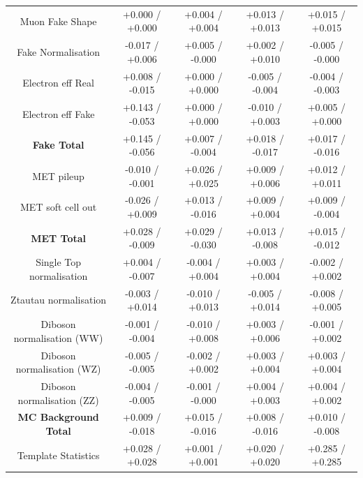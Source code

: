 \begin{table}[htbp]
\begin{center}
\begin{tabular}{|c|c|c|c|c|}
   \hline
   Muon Fake Shape                       &  +0.000   / +0.000   & +0.004   / +0.004   & +0.013   / +0.013   & +0.015   / +0.015   \\
   Fake Normalisation                    &  -0.017   / +0.006   & +0.005   / -0.000   & +0.002   / +0.010   & -0.005   / -0.000   \\
   Electron eff Real                     &  +0.008   / -0.015   & +0.000   / +0.000   & -0.005   / -0.004   & -0.004   / -0.003   \\
   Electron eff Fake                     &  +0.143   / -0.053   & +0.000   / +0.000   & -0.010   / +0.003   & +0.005   / +0.000   \\
   \hline
   \textbf{Fake Total}                   &  +0.145   / -0.056   & +0.007   / -0.004   & +0.018   / -0.017   & +0.017   / -0.016   \\
   \hline
   MET pileup                            &  -0.010   / -0.001   & +0.026   / +0.025   & +0.009   / +0.006   & +0.012   / +0.011   \\
   MET soft cell out                     &  -0.026   / +0.009   & +0.013   / -0.016   & +0.009   / +0.004   & +0.009   / -0.004   \\
   \hline
   \textbf{MET Total}                    &  +0.028   / -0.009   & +0.029   / -0.030   & +0.013   / -0.008   & +0.015   / -0.012   \\
   \hline
   Single Top normalisation              &  +0.004   / -0.007   & -0.004   / +0.004   & +0.003   / +0.004   & -0.002   / +0.002   \\
   Ztautau normalisation                 &  -0.003   / +0.014   & -0.010   / +0.013   & -0.005   / +0.014   & -0.008   / +0.005   \\
   Diboson normalisation (WW)            &  -0.001   / -0.004   & -0.010   / +0.008   & +0.003   / +0.006   & -0.001   / +0.002   \\
   Diboson normalisation (WZ)            &  -0.005   / -0.005   & -0.002   / +0.002   & +0.003   / +0.004   & +0.003   / +0.004   \\
   Diboson normalisation (ZZ)            &  -0.004   / -0.005   & -0.001   / -0.000   & +0.004   / +0.003   & +0.004   / +0.002   \\
   \hline
   \textbf{MC Background Total}          &  +0.009   / -0.018   & +0.015   / -0.016   & +0.008   / -0.016   & +0.010   / -0.008   \\
   \hline
   Template Statistics                   &  +0.028   / +0.028   & +0.001   / +0.001   & +0.020   / +0.020   & +0.285   / +0.285   \\

\end{tabular}
\end{center}
\end{table}
